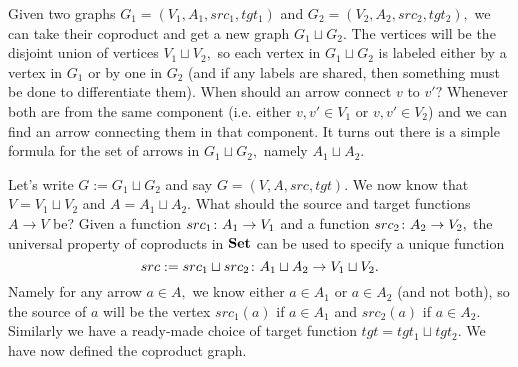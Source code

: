 \documentclass[../main/CT4S-EN-RU]{subfiles}
\begin{document}
\begin{exampleENG}\label{ex:coproduct of graphs}
Given two graphs $G_1=(V_1,A_1,src_1,tgt_1)$ and $G_2=(V_2,A_2,src_2,tgt_2),$ we can take their coproduct and get a new graph $G_1\sqcup G_2.$ The vertices will be the disjoint union of vertices $V_1\sqcup V_2,$ so each vertex in $G_1\sqcup G_2$ is labeled either by a vertex in $G_1$ or by one in $G_2$ (and if any labels are shared, then something must be done to differentiate them). When should an arrow connect $v$ to $v'?$ Whenever both are from the same component (i.e. either $v,v'\in V_1$ or $v,v'\in V_2$) and we can find an arrow connecting them in that component. It turns out there is a simple formula for the set of arrows in $G_1\sqcup G_2,$ namely $A_1\sqcup A_2.$

Let's write $G:=G_1\sqcup G_2$ and say $G=(V,A,src,tgt).$ We now know that $V=V_1\sqcup V_2$ and $A=A_1\sqcup A_2.$ What should the source and target functions $A\to V$ be? Given a function $src_1\colon A_1\rightarrow V_1$ and a function $src_2\colon A_2\rightarrow V_2,$ the universal property of coproducts in ${\mathbf{Set}}$ can be used to specify a unique function 
$$src:=src_1\sqcup src_2\colon A_1\sqcup A_2\rightarrow V_1\sqcup V_2.$$ 
Namely for any arrow $a\in A,$ we know either $a\in A_1$ or $a\in A_2$ (and not both), so the source of $a$ will be the vertex $src_1(a)$ if $a\in A_1$ and $src_2(a)$ if $a\in A_2.$ Similarly we have a ready-made choice of target function $tgt=tgt_1\sqcup tgt_2.$ We have now defined the coproduct graph.


\end{exampleENG}
\end{document}
